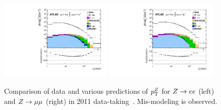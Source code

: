\begin{figure}[tp]
  \centering
  \includegraphics[width=0.48\textwidth]{figures/STDM-2012-23/fig_01a}
  \includegraphics[width=0.48\textwidth]{figures/STDM-2012-23/fig_01b}
  \caption{Comparison of data and various predictions of $p_{\mathrm{T}}^Z$ for $Z \rightarrow ee$ (left) and $Z \rightarrow \mu\mu$ (right) in 2011 data-taking~\cite{STDM-2012-23}. Mis-modeling is observed.}
  \label{fig:backgrounds-zpt}
\end{figure}

